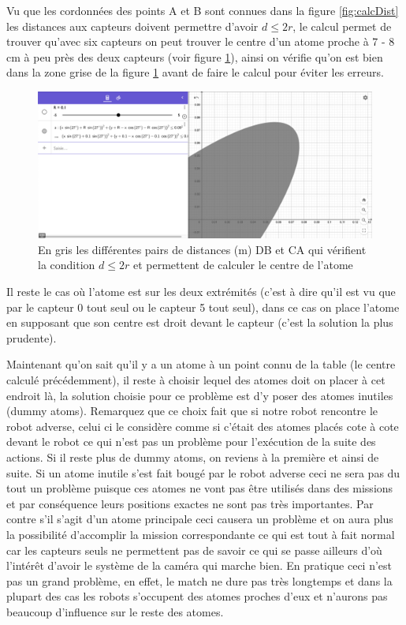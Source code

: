 \documentclass{article}
\begin{document}
Vu que les cordonnées des points A et B sont connues dans la figure \ref{fig:calcDist} les distances aux capteurs doivent permettre d'avoir $d \leq 2r$, le calcul permet de trouver qu'avec six capteurs on peut trouver le centre d'un atome proche à 7 - 8 cm à peu près des deux capteurs (voir figure  \ref{fig:accZone}), ainsi on vérifie qu'on est bien dans la zone grise de la figure \ref{fig:accZone} avant de faire le calcul pour éviter les erreurs.

\begin{figure}[!h]
\centering
\includegraphics[scale=0.24]{accZone}
\caption{En gris les différentes pairs de distances (m) DB et CA qui vérifient la condition $d \leq 2r$ et permettent de calculer le centre de l'atome}
\label{fig:accZone}
\end{figure}

Il reste le cas où l'atome est sur les deux extrémités (c'est à dire qu'il est vu que par le capteur 0 tout seul ou le capteur 5 tout seul), dans ce cas on place l'atome en supposant que son centre est droit devant le capteur (c'est la solution la plus prudente).

Maintenant qu'on sait qu'il y a un atome à un point connu de la table (le centre calculé précédemment), il reste à choisir lequel des atomes doit on placer à cet endroit là, la solution choisie pour ce problème est d'y poser des atomes inutiles (dummy atoms). Remarquez que ce choix fait que si notre robot rencontre le robot adverse, celui ci le considère comme si c'était des atomes placés cote à cote devant le robot ce qui n'est pas un problème pour l'exécution de la suite des actions. Si il reste plus de dummy atoms, on reviens à la première et ainsi de suite. 
Si un atome inutile s'est fait bougé par le robot adverse ceci ne sera pas du tout un problème puisque ces atomes ne vont pas être utilisés dans des missions et par conséquence leurs positions exactes ne sont pas très importantes. Par contre s'il s'agit d'un atome principale ceci causera un problème et on aura plus la possibilité d'accomplir la mission correspondante ce qui est tout à fait normal car les capteurs seuls ne permettent pas de savoir ce qui se passe ailleurs d'où l'intérêt d'avoir le système de la caméra qui marche bien. En pratique ceci n'est pas un grand problème, en effet, le match ne dure pas très longtemps et dans la plupart des cas les robots s'occupent des atomes proches d'eux et n'aurons pas beaucoup d'influence sur le reste des atomes.
\end{document}
